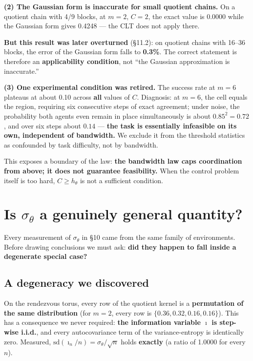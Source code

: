 \documentclass[11pt]{article}
\renewenvironment{quote}
  {\def\FrameCommand{{\color{gray!60}\vrule width 2pt}\hspace{8pt}}%
   \MakeFramed{\advance\hsize-\width \FrameRestore}\begin{itshape}}
  {\end{itshape}\endMakeFramed}
\begin{document}
\textbf{(2) The Gaussian form is inaccurate for small quotient chains.} On a quotient chain with 4/9 blocks, at \(m=2\), \(C=2\), the exact value is 0.0000 while the Gaussian form gives 0.4248 --- the CLT does not apply there.

\textbf{But this result was later overturned} (\S{}11.2): on quotient chains with 16--36 blocks, the error of the Gaussian form falls to \textbf{0.3\%}. The correct statement is therefore an \textbf{applicability condition}, not ``the Gaussian approximation is inaccurate.''

\textbf{(3) One experimental condition was retired.} The success rate at \(m=6\) plateaus at about 0.10 across \textbf{all} values of \(C\). Diagnosis: at \(m=6\), the cell equals the region, requiring six consecutive steps of exact agreement; under noise, the probability both agents even remain in place simultaneously is about \(0.85^2=0.72\), and over six steps about \(0.14\) --- \textbf{the task is essentially infeasible on its own, independent of bandwidth.} We exclude it from the threshold statistics as confounded by task difficulty, not by bandwidth.

\begin{quote}
This exposes a boundary of the law: \textbf{the bandwidth law caps coordination from above; it does not guarantee feasibility.} When the control problem itself is too hard, \(C\ge h_\theta\) is not a sufficient condition.
\end{quote}

\hypertarget{is-sigma_theta-a-genuinely-general-quantity}{%
\section{\texorpdfstring{Is \(\sigma_\theta\) a genuinely general quantity?}{Is \textbackslash sigma\_\textbackslash theta a genuinely general quantity?}}\label{is-sigma_theta-a-genuinely-general-quantity}}

Every measurement of \(\sigma_\theta\) in \S{}10 came from the same family of environments. Before drawing conclusions we must ask: \textbf{did they happen to fall inside a degenerate special case?}

\hypertarget{a-degeneracy-we-discovered}{%
\subsection{A degeneracy we discovered}\label{a-degeneracy-we-discovered}}

On the rendezvous torus, every row of the quotient kernel is a \textbf{permutation of the same distribution} (for \(m=2\), every row is \(\{0.36,0.32,0.16,0.16\}\)). This has a consequence we never required: \textbf{the information variable \(\imath\) is step-wise i.i.d.}, and every autocovariance term of the variance-entropy is identically zero. Measured, \(\mathrm{sd}(\imath_n/n)=\sigma_\theta/\sqrt n\) holds \textbf{exactly} (a ratio of 1.0000 for every \(n\)).
\end{document}
